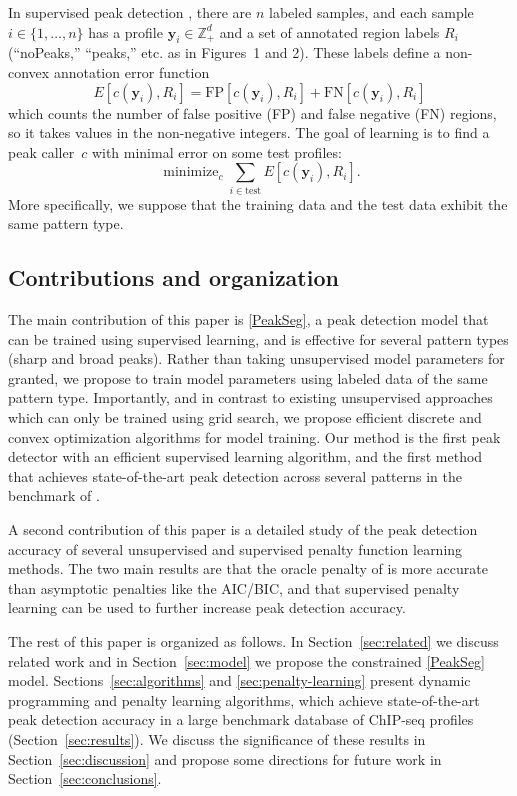 \documentclass{article}
\DeclareMathOperator*{\minimize}{minimize}
\newcommand{\ZZ}{\mathbb Z}
\begin{document}
In supervised peak detection \citep{hocking2014visual}, there are $n$
labeled samples, and each sample $i\in\{1, \dots, n\}$ has a profile
$\mathbf y_i\in\ZZ_+^d$ and a set of annotated region labels $R_i$
(``noPeaks,'' ``peaks,'' etc. as in Figures~1 and 2). These labels
define a non-convex annotation error function
\begin{equation}
  \label{eq:error}
  E[c(\mathbf y_i),  R_i] =
  \text{FP}[c(\mathbf y_i), R_i] +
  \text{FN}[c(\mathbf y_i), R_i]
\end{equation}
which counts the number of false positive (FP) and false negative (FN)
regions, so it takes values in the non-negative integers. The goal of
learning is to find a peak caller~$c$ with minimal error on some test
profiles:
\begin{equation}
  \label{eq:min_error}
  \minimize_c \sum_{i\in\text{test}} E[c(\mathbf y_i),  R_i].
\end{equation}
More specifically, we suppose that the training data and the test data
exhibit the same pattern type.


\subsection{Contributions and organization}

The main contribution of this paper is \ref{PeakSeg}, a peak detection
model that can be trained using supervised learning, and is effective
for several pattern types (sharp and broad peaks). Rather than taking
unsupervised model parameters for granted, we propose to train model
parameters using labeled data of the same pattern type. Importantly,
and in contrast to existing unsupervised approaches which can only be
trained using grid search, we propose efficient discrete and convex
optimization algorithms for model training. Our method is the first
peak detector with an efficient supervised learning algorithm, and the
first method that achieves state-of-the-art peak detection across
several patterns in the benchmark of \citet{hocking2014visual}.

A second contribution of this paper is a detailed study of the peak
detection accuracy of several unsupervised and supervised penalty
function learning methods. The two main results are that the oracle
penalty of \citet{cleynen2013segmentation} is more accurate than
asymptotic penalties like the AIC/BIC, and that supervised penalty
learning can be used to further increase peak detection accuracy.

The rest of this paper is organized as follows. In
Section~\ref{sec:related} we discuss related work and in
Section~\ref{sec:model} we propose the constrained \ref{PeakSeg}
model. Sections~\ref{sec:algorithms} and \ref{sec:penalty-learning}
present dynamic programming and penalty learning algorithms, which
achieve state-of-the-art peak detection accuracy in a large benchmark
database of ChIP-seq profiles (Section~\ref{sec:results}). We discuss
the significance of these results in Section~\ref{sec:discussion} and
propose some directions for future work in
Section~\ref{sec:conclusions}.
\end{document}
